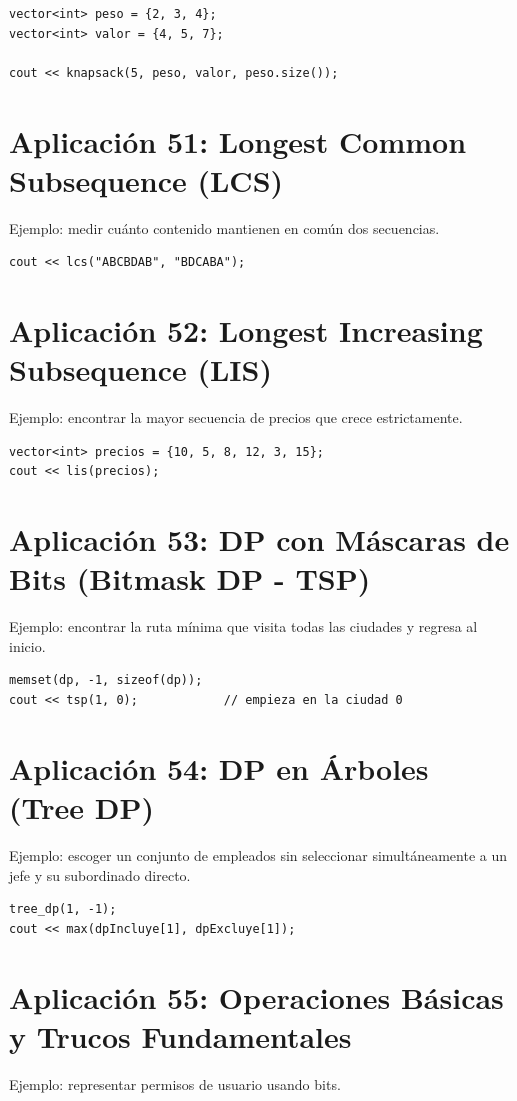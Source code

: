 \documentclass[10pt,twocolumn,letterpaper]{report}
\begin{document}
\begin{lstlisting}
vector<int> peso = {2, 3, 4};
vector<int> valor = {4, 5, 7};

cout << knapsack(5, peso, valor, peso.size());
\end{lstlisting}

\section{Aplicación 51: Longest Common Subsequence (LCS)}
Ejemplo: medir cuánto contenido mantienen en común dos secuencias.

\begin{lstlisting}
cout << lcs("ABCBDAB", "BDCABA");
\end{lstlisting}

\section{Aplicación 52: Longest Increasing Subsequence (LIS)}
Ejemplo: encontrar la mayor secuencia de precios que crece estrictamente.

\begin{lstlisting}
vector<int> precios = {10, 5, 8, 12, 3, 15};
cout << lis(precios);
\end{lstlisting}

\section{Aplicación 53: DP con Máscaras de Bits (Bitmask DP - TSP)}
Ejemplo: encontrar la ruta mínima que visita todas las ciudades y regresa al inicio.

\begin{lstlisting}
memset(dp, -1, sizeof(dp));
cout << tsp(1, 0);            // empieza en la ciudad 0
\end{lstlisting}

\section{Aplicación 54: DP en Árboles (Tree DP)}
Ejemplo: escoger un conjunto de empleados sin seleccionar simultáneamente a un jefe y su subordinado directo.

\begin{lstlisting}
tree_dp(1, -1);
cout << max(dpIncluye[1], dpExcluye[1]);
\end{lstlisting}

\section{Aplicación 55: Operaciones Básicas y Trucos Fundamentales}
Ejemplo: representar permisos de usuario usando bits.
\end{document}
